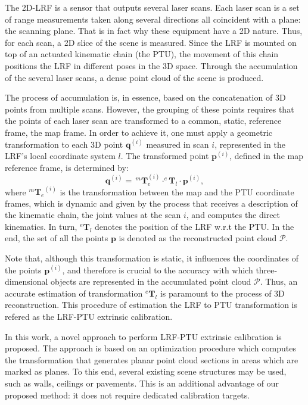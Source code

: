 \documentclass[conference]{IEEEtran}
\begin{document}
The 2D-LRF is a sensor that outputs several laser scans. Each laser scan is a set of range measurements taken along several directions all coincident with a plane: the scanning plane. That is in fact why these equipment have a 2D nature. Thus, for each scan, a 2D slice of the scene is measured. Since the LRF is mounted on top of an actuated kinematic chain (the PTU), the movement of this chain positions the LRF in different poses in the 3D space. Through the accumulation of the several laser scans, a dense point cloud of the scene is produced. 

The process of accumulation is, in essence, based on the concatenation of 3D points from multiple scans. However, the grouping of these points requires that the points of each laser scan are transformed to a common, static, reference frame, the map frame. In order to achieve it, one must apply a geometric transformation to each 3D point $\mathbf{q}^{(i)}$ measured in scan $i$, represented in the LRF's local coordinate system $l$. The transformed point $\mathbf{p}^{(i)}$, defined in the map reference frame, is determined by:
%
\begin{equation}\label{equation:point-reconstruction}
    \mathbf{q}^{(i)} = \, ^{m}\mathbf{T}_{e}^{(i)} \cdot ^{e}\mathbf{T}_{l} \cdot \mathbf{p}^{(i)},
\end{equation}
%
\noindent where ${^{m}\mathbf{T}_{e}}^{(i)}$ is the transformation between the map and the PTU coordinate frames, which is dynamic and given by the process that receives a description of the kinematic chain, the joint values at the scan $i$, and computes the direct kinematics. In turn, $^{e}\mathbf{T}_{l}$ denotes the position of the LRF w.r.t the PTU. In the end, the set of all the points $\mathbf{p}$ is denoted as the reconstructed point cloud $\mathcal{P}$.

Note that, although this transformation is static, it influences the coordinates of the points $\mathbf{p}^{(i)}$, and therefore is crucial to the accuracy with which three-dimensional objects are represented in the accumulated point cloud $\mathcal{P}$.
Thus, an accurate estimation of transformation $^{e}\mathbf{T}_{l}$ is paramount to the process of 3D reconstruction. This procedure of estimation the LRF to PTU transformation is refered as the LRF-PTU extrinsic calibration.

In this work, a novel approach to perform LRF-PTU extrinsic calibration is proposed. The approach is based on an optimization procedure which computes the transformation that generates planar point cloud sections in areas which are marked as planes. To this end, several existing scene structures may be used, such as walls, ceilings or pavements. This is an additional advantage of our proposed method: it does not require dedicated calibration targets.
\end{document}
